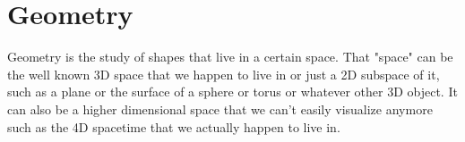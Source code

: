 \chapter{Geometry}
Geometry is the study of shapes that live in a certain space. That "space" can be the well known 3D space that we happen to live in or just a 2D subspace of it, such as a plane or the surface of a sphere or torus or whatever other 3D object. It can also be a higher dimensional space that we can't easily visualize anymore such as the 4D spacetime that we actually happen to live in.

\begin{comment}
https://en.wikipedia.org/wiki/Geometrization_conjecture#The_eight_Thurston_geometries

\end{comment}
